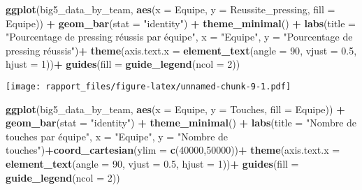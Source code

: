 \documentclass[
]{article}
\newenvironment{Shaded}{\begin{snugshade}}{\end{snugshade}}
\newcommand{\AttributeTok}[1]{\textcolor[rgb]{0.13,0.29,0.53}{#1}}
\newcommand{\DecValTok}[1]{\textcolor[rgb]{0.00,0.00,0.81}{#1}}
\newcommand{\FloatTok}[1]{\textcolor[rgb]{0.00,0.00,0.81}{#1}}
\newcommand{\FunctionTok}[1]{\textcolor[rgb]{0.13,0.29,0.53}{\textbf{#1}}}
\newcommand{\NormalTok}[1]{#1}
\newcommand{\SpecialCharTok}[1]{\textcolor[rgb]{0.81,0.36,0.00}{\textbf{#1}}}
\newcommand{\StringTok}[1]{\textcolor[rgb]{0.31,0.60,0.02}{#1}}
\begin{document}
\begin{Shaded}
\begin{Highlighting}[]
\FunctionTok{ggplot}\NormalTok{(big5\_data\_by\_team, }\FunctionTok{aes}\NormalTok{(}\AttributeTok{x =}\NormalTok{ Equipe, }\AttributeTok{y =}\NormalTok{ Reussite\_pressing, }\AttributeTok{fill =}\NormalTok{ Equipe)) }\SpecialCharTok{+} \FunctionTok{geom\_bar}\NormalTok{(}\AttributeTok{stat =} \StringTok{"identity"}\NormalTok{) }\SpecialCharTok{+} \FunctionTok{theme\_minimal}\NormalTok{() }\SpecialCharTok{+} \FunctionTok{labs}\NormalTok{(}\AttributeTok{title =} \StringTok{"Pourcentage de pressing réussis par équipe"}\NormalTok{, }\AttributeTok{x =} \StringTok{"Equipe"}\NormalTok{, }\AttributeTok{y =} \StringTok{"Pourcentage de pressing réussis"}\NormalTok{)}\SpecialCharTok{+}  \FunctionTok{theme}\NormalTok{(}\AttributeTok{axis.text.x =} \FunctionTok{element\_text}\NormalTok{(}\AttributeTok{angle =} \DecValTok{90}\NormalTok{, }\AttributeTok{vjust =} \FloatTok{0.5}\NormalTok{, }\AttributeTok{hjust =} \DecValTok{1}\NormalTok{))}\SpecialCharTok{+}
  \FunctionTok{guides}\NormalTok{(}\AttributeTok{fill =} \FunctionTok{guide\_legend}\NormalTok{(}\AttributeTok{ncol =} \DecValTok{2}\NormalTok{))}
\end{Highlighting}
\end{Shaded}

\texttt{[image: rapport\_files/figure-latex/unnamed-chunk-9-1.pdf]}

\begin{Shaded}
\begin{Highlighting}[]
\FunctionTok{ggplot}\NormalTok{(big5\_data\_by\_team, }\FunctionTok{aes}\NormalTok{(}\AttributeTok{x =}\NormalTok{ Equipe, }\AttributeTok{y =}\NormalTok{ Touches, }\AttributeTok{fill =}\NormalTok{ Equipe)) }\SpecialCharTok{+} \FunctionTok{geom\_bar}\NormalTok{(}\AttributeTok{stat =} \StringTok{"identity"}\NormalTok{) }\SpecialCharTok{+} \FunctionTok{theme\_minimal}\NormalTok{() }\SpecialCharTok{+} \FunctionTok{labs}\NormalTok{(}\AttributeTok{title =} \StringTok{"Nombre de touches par équipe"}\NormalTok{, }\AttributeTok{x =} \StringTok{"Equipe"}\NormalTok{, }\AttributeTok{y =} \StringTok{"Nombre de touches"}\NormalTok{)}\SpecialCharTok{+}\FunctionTok{coord\_cartesian}\NormalTok{(}\AttributeTok{ylim =} \FunctionTok{c}\NormalTok{(}\DecValTok{40000}\NormalTok{,}\DecValTok{50000}\NormalTok{))}\SpecialCharTok{+}  \FunctionTok{theme}\NormalTok{(}\AttributeTok{axis.text.x =} \FunctionTok{element\_text}\NormalTok{(}\AttributeTok{angle =} \DecValTok{90}\NormalTok{, }\AttributeTok{vjust =} \FloatTok{0.5}\NormalTok{, }\AttributeTok{hjust =} \DecValTok{1}\NormalTok{))}\SpecialCharTok{+}
  \FunctionTok{guides}\NormalTok{(}\AttributeTok{fill =} \FunctionTok{guide\_legend}\NormalTok{(}\AttributeTok{ncol =} \DecValTok{2}\NormalTok{))}
\end{Highlighting}
\end{Shaded}
\end{document}
